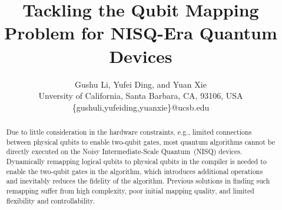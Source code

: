 \documentclass[journal,10pt,twocolumn]{IEEEtran}
\begin{document}
\title{Tackling the Qubit Mapping Problem for NISQ-Era Quantum Devices}

\author{Gushu Li, Yufei Ding, and Yuan Xie \\
Unversity of California, Santa Barbara, CA, 93106, USA   \\ 
\{gushuli,yufeiding,yuanxie\}@ucsb.edu}

\maketitle

\begin{abstract}
Due to little consideration in the hardware constraints, e.g., limited connections between physical qubits to enable two-qubit gates, most quantum algorithms cannot be directly executed on the Noisy Intermediate-Scale Quantum~(NISQ) devices. %
Dynamically remapping logical qubits to physical qubits in the compiler is needed to enable the two-qubit gates in the algorithm, which introduces additional operations and inevitably reduces the fidelity of the algorithm. Previous solutions in finding such remapping suffer from high complexity, poor initial mapping quality, and limited flexibility and controllability. 



\end{abstract}
\end{document}
